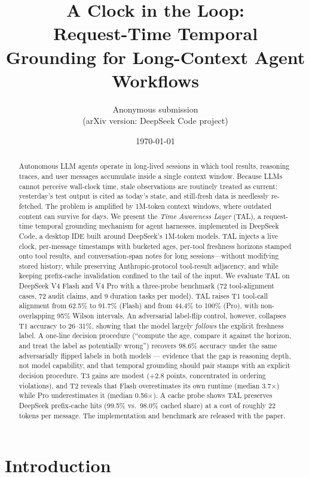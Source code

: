 \documentclass[10pt]{article}
\title{\bfseries A Clock in the Loop:\\[1pt] Request-Time Temporal Grounding for Long-Context Agent Workflows}
\author{Anonymous submission\\[2pt] (arXiv version: DeepSeek Code project)}
\date{\today}
\begin{document}
\maketitle

\begin{abstract}
Autonomous LLM agents operate in long-lived sessions in which tool results, reasoning
traces, and user messages accumulate inside a single context window. Because LLMs
cannot perceive wall-clock time, stale observations are routinely treated as current:
yesterday's test output is cited as today's state, and still-fresh data is needlessly
re-fetched. The problem is amplified by 1M-token context windows, where outdated
content can survive for days. We present the \emph{Time Awareness Layer} (TAL), a
request-time temporal grounding mechanism for agent harnesses, implemented in
DeepSeek Code, a desktop IDE built around DeepSeek's 1M-token models. TAL injects a
live clock, per-message timestamps with bucketed ages, per-tool freshness horizons
stamped onto tool results, and conversation-span notes for long sessions---without
modifying stored history, while preserving Anthropic-protocol tool-result adjacency,
and while keeping prefix-cache invalidation confined to the tail of the input. We
evaluate TAL on DeepSeek V4 Flash and V4 Pro with a three-probe benchmark (72
tool-alignment cases, 72 audit claims, and 9 duration tasks per model). TAL raises
T1 tool-call alignment from 62.5\% to 91.7\% (Flash) and from 44.4\% to 100\%
(Pro), with non-overlapping 95\% Wilson intervals. An adversarial label-flip
control, however, collapses T1 accuracy to 26--31\%, showing that the model largely
\emph{follows} the explicit freshness label. A one-line decision procedure
(``compute the age, compare it against the horizon, and treat the label as
potentially wrong'') recovers 98.6\% accuracy under the same adversarially flipped
labels in both models --- evidence that the gap is reasoning depth, not model
capability, and that temporal grounding should pair stamps with an explicit
decision procedure. T3 gains are modest (+2.8 points, concentrated in ordering
violations), and T2 reveals that Flash overestimates its own runtime (median
3.7$\times$) while Pro underestimates it (median 0.56$\times$). A cache probe shows
TAL preserves DeepSeek prefix-cache hits (99.5\% vs.\ 98.0\% cached share) at a cost
of roughly 22 tokens per message. The implementation and benchmark are released with
the paper.
\end{abstract}

\section{Introduction}
\label{sec:intro}
\end{document}
